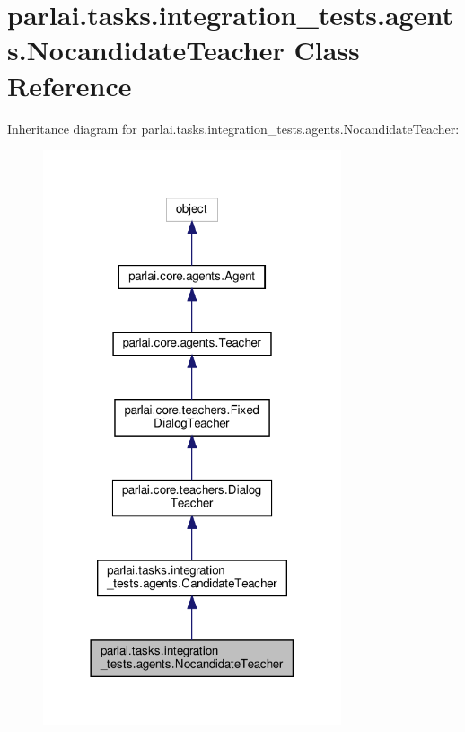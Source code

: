 \hypertarget{classparlai_1_1tasks_1_1integration__tests_1_1agents_1_1NocandidateTeacher}{}\section{parlai.\+tasks.\+integration\+\_\+tests.\+agents.\+Nocandidate\+Teacher Class Reference}
\label{classparlai_1_1tasks_1_1integration__tests_1_1agents_1_1NocandidateTeacher}


Inheritance diagram for parlai.\+tasks.\+integration\+\_\+tests.\+agents.\+Nocandidate\+Teacher\+:
\nopagebreak
\begin{figure}[H]
\begin{center}
\leavevmode
\includegraphics[width=249pt]{classparlai_1_1tasks_1_1integration__tests_1_1agents_1_1NocandidateTeacher__inherit__graph}
\end{center}
\end{figure}


